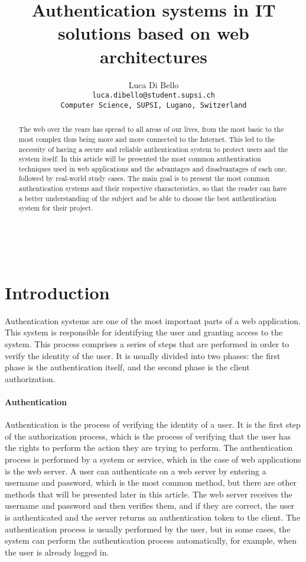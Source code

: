 \documentclass[12pt]{article}
\title{Authentication systems in IT solutions based on web architectures}
\author{Luca Di Bello\\
        \small \tt{luca.dibello@student.supsi.ch} \\
        \small Computer Science, SUPSI, Lugano, Switzerland \\
}
\date{}
\begin{document}
\maketitle
\begin{abstract} 
\noindent
The web over the years has spread to all areas of our lives, from the most basic to the most complex thus being more and more connected to the Internet. This led to the necessity of having a secure and reliable authentication system to protect users and the system itself. In this article will be presented the most common authentication techniques used in web applications and the advantages and disadvantages of each one, followed by real-world study cases. The main goal is to present the most common authentication systems and their respective characteristics, so that the reader can have a better understanding of the subject and be able to choose the best authentication system for their project.

\end{abstract}

\\

\section{Introduction}
Authentication systems are one of the most important parts of a web application. This system is responsible for identifying the user and granting access to the system. This process comprises a series of steps that are performed in order to verify the identity of the user. It is usually divided into two phases: the first phase is the authentication itself, and the second phase is the client authorization.

\paragraph{Authentication} Authentication is the process of verifying the identity of a user. It is the first step of the authorization process, which is the process of verifying that the user has the rights to perform the action they are trying to perform. The authentication process is performed by a system or service, which in the case of web applications is the web server. A user can authenticate on a web server by entering a username and password, which is the most common method, but there are other methods that will be presented later in this article. The web server receives the username and password and then verifies them, and if they are correct, the user is authenticated and the server returns an authentication token to the client.
The authentication process is usually performed by the user, but in some cases, the system can perform the authentication process automatically, for example, when the user is already logged in.
\end{document}
